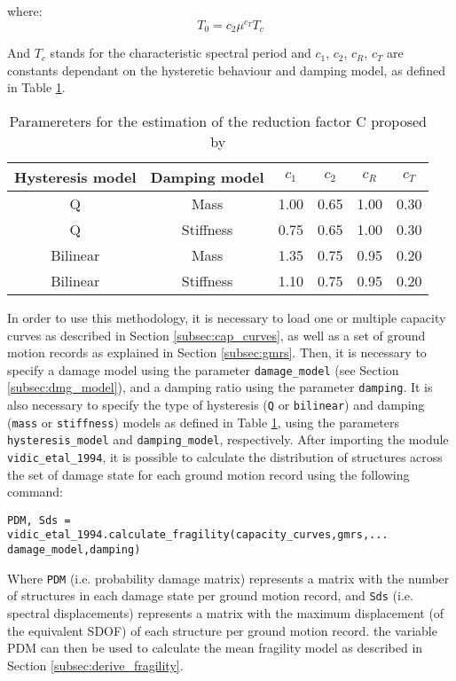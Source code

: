 where: 
\begin{equation}
T_0 = c_2\mu^{c_T}T_c
\end{equation} 

And $T_c$ stands for the characteristic spectral period and $c_1$, $c_2$, $c_R$, $c_T$ are constants dependant on the hysteretic behaviour and damping model, as defined in Table \ref{table:VidicEtAl}.

\begin {table}[htb]
\caption{Paramereters for the estimation of the reduction factor C proposed by \citep{VidicEtAl1994}} 
\label{table:VidicEtAl} 
\begin{center}
  \begin{tabular}{ | c | c | c | c | c | c |}
    \hline
    Hysteresis model & Damping model & $c_1$ & $c_2$ & $c_R$ & $c_T$ \\ \hline
    Q & Mass & 1.00 & 0.65 & 1.00 & 0.30 \\ \hline
    Q & Stiffness & 0.75 & 0.65 & 1.00 & 0.30 \\ \hline
    Bilinear & Mass & 1.35 & 0.75 & 0.95 & 0.20 \\ \hline
    Bilinear & Stiffness & 1.10 & 0.75 & 0.95 & 0.20 \\ \hline
  \end{tabular}
\end{center}
\end{table}

In order to use this methodology, it is necessary to load one or multiple capacity curves as described in Section \ref{subsec:cap_curves}, as well as a set of ground motion records as explained in Section \ref{subsec:gmrs}. Then, it is necessary to specify a damage model using the parameter \verb=damage_model= (see Section \ref{subsec:dmg_model}), and a damping ratio using the parameter \verb=damping=. It is also necessary to specify the type of hysteresis (\verb=Q= or \verb=bilinear=) and damping (\verb=mass= or \verb=stiffness=) models as defined in Table \ref{table:VidicEtAl}, using the parameters \verb=hysteresis_model= and \verb=damping_model=, respectively. After importing the module \verb=vidic_etal_1994=, it is possible to calculate the distribution of structures across the set of damage state for each ground motion record using the following command:

\begin{Verbatim}[frame=single, commandchars=\\\{\}, samepage=true]
PDM, Sds = vidic_etal_1994.calculate_fragility(capacity_curves,gmrs,...
damage_model,damping)
\end{Verbatim}

Where \verb=PDM= (i.e. probability damage matrix) represents a matrix with the number of structures in each damage state per ground motion record, and \verb=Sds= (i.e. spectral displacements) represents a matrix with the maximum displacement (of the equivalent SDOF) of each structure per ground motion record. the variable PDM can then be used to calculate the mean fragility model as described in Section \ref{subsec:derive_fragility}.



